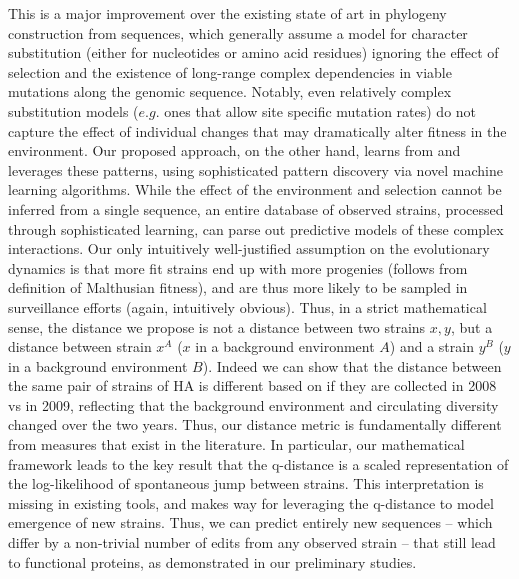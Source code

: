 \documentclass[onecolumn, compsoc,10pt]{IEEEtran}
\begin{document}
This is a major improvement over the existing state of art in phylogeny construction from sequences, which generally assume a model for character substitution (either for nucleotides or amino acid residues) ignoring the effect of selection and the existence of long-range complex dependencies in viable mutations along the genomic sequence. Notably, even relatively complex substitution models ($e.g.$ ones that allow site specific mutation rates) do not capture the effect of individual changes that may dramatically alter fitness in the environment. Our proposed approach, on the other hand, learns from and leverages these patterns, using sophisticated pattern discovery via novel machine learning algorithms. While the effect of the environment and selection cannot be inferred from a single sequence, an entire database of observed strains, processed through sophisticated learning, can parse out predictive models of these complex interactions. Our only intuitively well-justified assumption on the evolutionary dynamics is that more fit strains end up with more progenies (follows from definition of Malthusian fitness), and are thus more likely to be sampled in surveillance efforts (again, intuitively obvious).  Thus, in a strict mathematical sense, the distance we propose is not a distance between two strains $x,y$, but a distance between strain $x^A$ ($x$ in a background environment $A$) and a strain  $y^B$ ($y$ in a background environment $B$). Indeed we can show that the distance between the same pair of  strains of \infl HA is different based on if they are collected in 2008 vs in 2009, reflecting that the background environment and circulating diversity changed over the two years.  Thus, our  distance metric  is fundamentally different from measures that exist in the literature. In particular, our mathematical framework leads to the key result that the q-distance is a scaled representation of the log-likelihood of spontaneous jump  between strains. This interpretation is missing in existing tools, and makes way for leveraging the q-distance to model emergence of new strains. Thus, we can predict entirely new sequences -- which differ by a non-trivial number of edits from any observed strain -- that still lead to functional proteins, as demonstrated in our preliminary studies.
\end{document}
